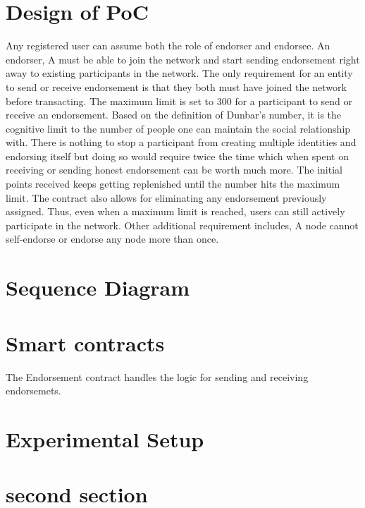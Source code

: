 \section{Design of PoC}

Any registered user can assume both the role of endorser and endorsee. An
endorser, A must be able to join the network and start sending endorsement
right away to existing participants in the network. The only requirement for an
entity to send or receive endorsement is that they both must have joined the
network before transacting.  The maximum limit is set to 300 for a participant
to send or receive an endorsement. Based on the definition of Dunbar's number, it
is the cognitive limit to the number of people one can maintain the social
relationship with. There is nothing to stop a participant from creating
multiple identities and endorsing itself but doing so would require twice the
time which when spent on receiving or sending honest endorsement can be worth
much more.  The initial points received keeps getting replenished until the
number hits the maximum limit. The contract also allows for eliminating any
endorsement previously assigned. Thus, even when a maximum limit is reached,
users can still actively participate in the network.  Other additional
requirement includes, A node cannot self-endorse or endorse any node more than
once. 


\section{Sequence Diagram}



\section{Smart contracts}
The Endorsement contract handles the logic for sending and receiving endorsemets.  


\section{Experimental Setup} \label{sec:sectionlabel}


\section{second section}

